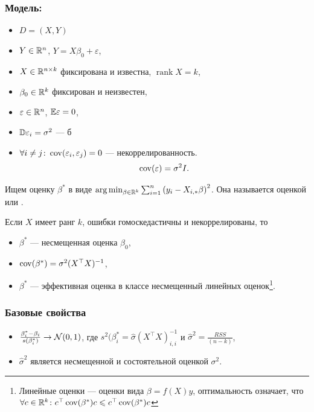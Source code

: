 \documentclass[11pt]{book}
\begin{document}
\subsubsection{Модель:}
\begin{itemize}
	\item $D = (X, Y)$
	\item  $Y \in \mathbb{R}^{n}$, $Y = X \beta_0 + \varepsilon$,
	\item $X \in \mathbb{R}^{n \times k}$ фиксирована и известна, $\operatorname{rank} X = k$,
	\item  $\beta_0 \in \mathbb{R}^{k}$ фиксирован и неизвестен,
	\item $\varepsilon \in  \mathbb{R}^{n}$, $\mathbb{E} \varepsilon = 0$,
	\item $\mathbb{D} \varepsilon_i = \sigma^2$ --- б
	\item  $ \forall i \neq j\colon\operatorname{cov}(\varepsilon_i, \varepsilon_j) = 0$ --- некоррелированность.
		\[
		\operatorname{cov} (\varepsilon) = \sigma^2 I
		.\] 
\end{itemize}
Ищем оценку $\beta^*$ в виде $\arg \min_{\beta \in \mathbb{R}^{k}} \sum_{i=1}^{n} \left( y_i - X_{i, *} \beta \right) ^2$.
Она называется оценкой  или .
\begin{theorem}
	Если $X$ имеет ранг $k$, ошибки гомоскедастичны и некоррелированы, то
	\begin{itemize}
		\item $\beta^*$ --- несмещенная оценка $\beta_0$,
		\item $\operatorname{cov}(\beta^*) = \sigma^2(X^{\top} X)^{-1}$,
		\item $\beta^*$ --- эффективная оценка в классе несмещенный линейных оценок\footnote{Линейные оценки --- оценки вида $\beta = f(X) y$, оптимальность означает, что $ \forall c \in \mathbb{R}^{k} \colon c^{\top}\operatorname{cov}(\beta^*) c \leqslant c^{\top} \operatorname{cov}( \beta^*) c$ }.
	\end{itemize}
\end{theorem}
\subsubsection{Базовые свойства}
\begin{itemize}
	\item $\frac{\beta^*_i-\beta_i}{s(\beta^*_i)} \to \mathcal{N}(0, 1)$, где $s^2(\beta^*_i = \hat{\sigma} \left( X^{\top} X \right)^{-1}_{i, i}$ и $\hat{\sigma}^2 = \frac{RSS}{(n-k)}$,
	\item $\hat{\sigma}^2$ является несмещенной и состоятельной оценкой $\sigma^2$. 
\end{itemize}
\end{document}
